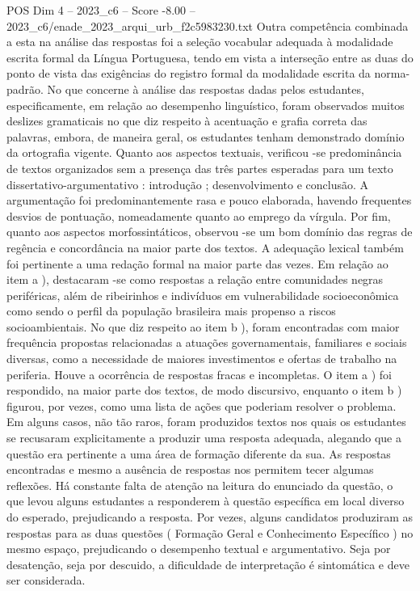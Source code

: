 \begin{textsample}{POS Dim 4 – 2023\_c6 – Score -8.00 – 2023\_c6/enade\_2023\_arqui\_urb\_f2c5983230.txt}
Outra competência combinada a esta na análise das respostas foi a seleção vocabular adequada à modalidade escrita formal da Língua Portuguesa, tendo em vista a interseção entre as duas do ponto de vista das exigências do registro formal da modalidade escrita da norma-padrão.
No que concerne à análise das respostas dadas pelos estudantes, especificamente, em relação ao desempenho linguístico, foram observados muitos deslizes gramaticais no que diz respeito à acentuação e grafia correta das palavras, embora, de maneira geral, os estudantes tenham demonstrado domínio da ortografia vigente.
Quanto aos aspectos textuais, verificou -se predominância de textos organizados sem a presença das três partes esperadas para um texto dissertativo-argumentativo : introdução ; desenvolvimento e conclusão.
A argumentação foi predominantemente rasa e pouco elaborada, havendo frequentes desvios de pontuação, nomeadamente quanto ao emprego da vírgula.
Por fim, quanto aos aspectos morfossintáticos, observou -se um bom domínio das regras de regência e concordância na maior parte dos textos.
A adequação lexical também foi pertinente a uma redação formal na maior parte das vezes.
Em relação ao item a ), destacaram -se como respostas a relação entre comunidades negras periféricas, além de ribeirinhos e indivíduos em vulnerabilidade socioeconômica como sendo o perfil da população brasileira mais propenso a riscos socioambientais.
No que diz respeito ao item b ), foram encontradas com maior frequência propostas relacionadas a atuações governamentais, familiares e sociais diversas, como a necessidade de maiores investimentos e ofertas de trabalho na periferia.
Houve a ocorrência de respostas fracas e incompletas.
O item a ) foi respondido, na maior parte dos textos, de modo discursivo, enquanto o item b ) figurou, por vezes, como uma lista de ações que poderiam resolver o problema.
Em alguns casos, não tão raros, foram produzidos textos nos quais os estudantes se recusaram explicitamente a produzir uma resposta adequada, alegando que a questão era pertinente a uma área de formação diferente da sua.
As respostas encontradas e mesmo a ausência de respostas nos permitem tecer algumas reflexões.
Há constante falta de atenção na leitura do enunciado da questão, o que levou alguns estudantes a responderem à questão específica em local diverso do esperado, prejudicando a resposta.
Por vezes, alguns candidatos produziram as respostas para as duas questões ( Formação Geral e Conhecimento Específico ) no mesmo espaço, prejudicando o desempenho textual e argumentativo.
Seja por desatenção, seja por descuido, a dificuldade de interpretação é sintomática e deve ser considerada.

\end{textsample}
